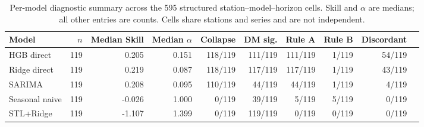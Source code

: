 \begin{table}[ht]
\centering
\caption{Per-model diagnostic summary across the 595 structured
station--model--horizon cells. Skill and $\alpha$ are medians; all other
entries are counts. Cells share stations and series and are not independent.}
\label{tab:model_summary}
\begin{tabular}{lrrrrrrrrr}
\toprule
Model & $n$ & Median Skill & Median $\alpha$ & Collapse & DM sig. & Rule A & Rule B & Discordant \\
\midrule
HGB direct & 119 & 0.205 & 0.151 & 118/119 & 111/119 & 111/119 & 1/119 & 54/119 \\
Ridge direct & 119 & 0.219 & 0.087 & 118/119 & 117/119 & 117/119 & 1/119 & 43/119 \\
SARIMA & 119 & 0.208 & 0.095 & 110/119 & 44/119 & 44/119 & 1/119 & 4/119 \\
Seasonal naive & 119 & -0.026 & 1.000 & 0/119 & 39/119 & 5/119 & 5/119 & 0/119 \\
STL+Ridge & 119 & -1.107 & 1.399 & 0/119 & 119/119 & 0/119 & 0/119 & 0/119 \\
\bottomrule
\end{tabular}
\end{table}
